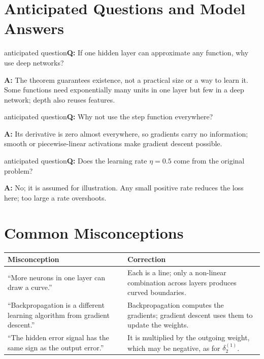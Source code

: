 \documentclass[11pt]{article}
\begin{document}
\section{Anticipated Questions and Model Answers}

\begin{question}{anticipated question}\textbf{Q:} If one hidden layer can approximate any function, why use deep networks?\par\smallskip\textbf{A:} The theorem guarantees existence, not a practical size or a way to learn it. Some functions need exponentially many units in one layer but few in a deep network; depth also reuses features.\end{question}

\begin{question}{anticipated question}\textbf{Q:} Why not use the step function everywhere?\par\smallskip\textbf{A:} Its derivative is zero almost everywhere, so gradients carry no information; smooth or piecewise-linear activations make gradient descent possible.\end{question}

\begin{question}{anticipated question}\textbf{Q:} Does the learning rate $\eta=0.5$ come from the original problem?\par\smallskip\textbf{A:} No; it is assumed for illustration. Any small positive rate reduces the loss here; too large a rate overshoots.\end{question}

\section{Common Misconceptions}\begin{center}\small\renewcommand{\arraystretch}{1.35}\begin{tabularx}{\textwidth}{@{}>{\raggedright\arraybackslash}X >{\raggedright\arraybackslash}X@{}}\toprule\textbf{Misconception} & \textbf{Correction}\\\midrule``More neurons in one layer can draw a curve.'' & Each is a line; only a non-linear combination across layers produces curved boundaries.\\
``Backpropagation is a different learning algorithm from gradient descent.'' & Backpropagation computes the gradients; gradient descent uses them to update the weights.\\
``The hidden error signal has the same sign as the output error.'' & It is multiplied by the outgoing weight, which may be negative, as for $\delta^{(1)}_2$.\\\bottomrule\end{tabularx}\end{center}
\end{document}

